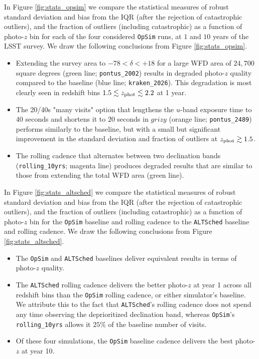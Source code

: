 In Figure \ref{fig:stats_opsim} we compare the statistical measures of robust standard deviation and bias from the IQR (after the rejection of catastrophic outliers), and the fraction of outliers (including catastrophic) as a function of photo-$z$ bin for each of the four considered {\tt OpSim} runs, at $1$ and $10$ years of the LSST survey. We draw the following conclusions from Figure \ref{fig:stats_opsim}. 
\begin{itemize}
\item Extending the survey area to $-78 < \delta < +18$ for a large WFD area of $24,700$ square degrees (green line; {\tt pontus\_2002}) results in degraded photo-$z$ quality compared to the baseline (blue line; {\tt kraken\_2026}). This degradation is most clearly seen in redshift bins $1.5 \lesssim z_{\rm phot} \lesssim 2.2$ at 1 year.
\item The 20/40s "many visits" option that lengthens the $u$-band exposure time to $40$ seconds and shortens it to $20$ seconds in $grizy$ (orange line; {\tt pontus\_2489}) performs similarly to the baseline, but with a small but significant improvement in the standard deviation and fraction of outliers at $z_{\rm phot} \gtrsim 1.5$.
\item The rolling cadence that alternates between two declination bands ({\tt rolling\_10yrs}; magenta line) produces degraded results that are similar to those from extending the total WFD area (green line).
\end{itemize}

In Figure \ref{fig:stats_altsched} we compare the statistical measures of robust standard deviation and bias from the IQR (after the rejection of catastrophic outliers), and the fraction of outliers (including catastrophic) as a function of photo-$z$ bin for the {\tt OpSim} baseline and rolling cadence to the {\tt ALTSched} baseline and rolling cadence. We draw the following conclusions from Figure \ref{fig:stats_altsched}. 
\begin{itemize}
\item The {\tt OpSim} and {\tt ALTSched} baselines deliver equivalent results in terms of photo-$z$ quality.
\item The {\tt ALTSched} rolling cadence delivers the better photo-$z$ at year 1 across all redshift bins than the {\tt OpSim} rolling cadence, or either simulator's baseline. We attribute this to the fact that {\tt ALTSched}'s rolling cadence does not spend any time observing the deprioritized declination band, whereas {\tt OpSim}'s {\tt rolling\_10yrs} allows it $25\%$ of the baseline number of visits.
\item Of these four simulations, the {\tt OpSim} baseline cadence delivers the best photo-$z$ at year 10.
\end{itemize}

